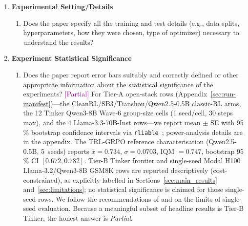 \documentclass{article}
\newcommand{\answerPartial}[1][]{\textcolor{purple}{[Partial] #1}}
\begin{document}
\begin{enumerate}
\item {\bf Experimental Setting/Details}
    \begin{enumerate}
    \item Does the paper specify all the training and test details
          (e.g., data splits, hyperparameters, how they were chosen,
          type of optimizer) necessary to understand the results?
    \end{enumerate}

\item {\bf Experiment Statistical Significance}
    \begin{enumerate}
    \item Does the paper report error bars suitably and correctly
          defined or other appropriate information about the statistical
          significance of the experiments?
    \answerPartial{For Tier-A open-stack rows
    (Appendix~\ref{sec:run-manifest})---the
    CleanRL/SB3/Tianshou/Qwen2.5-0.5B classic-RL arms, the 12 Tinker
    Qwen3-8B Wave-6 group-size cells (1 seed/cell, 30 steps max), and
    the 4 Llama-3.3-70B-Inst rows---we
    report mean $\pm$ SE with 95\,\% bootstrap confidence intervals via
    \texttt{rliable}~\cite{agarwal2021deep}; power-analysis details are in the appendix.  The TRL-GRPO reference characterisation
    (Qwen2.5-0.5B, 5~seeds) reports $\bar{x}=0.734$,
    $\sigma=0.0703$, IQM $=0.747$, bootstrap 95\,\% CI $[0.672, 0.782]$.
    Tier-B Tinker frontier and single-seed Modal H100 Llama-3.2/Qwen3-8B
    GSM8K rows are reported descriptively (cost-constrained), as
    explicitly labelled in Sections~\ref{sec:main_results}
    and~\ref{sec:limitations}; no statistical significance is claimed
    for those single-seed rows.  We follow the recommendations of
    \citet{colas2019hitchhiker} and \citet{jordan2024benchmarking} on
    the limits of single-seed evaluation.  Because a meaningful subset
    of headline results is Tier-B Tinker, the honest answer is
    \emph{Partial}.}
    \end{enumerate}


\end{enumerate}
\end{document}
